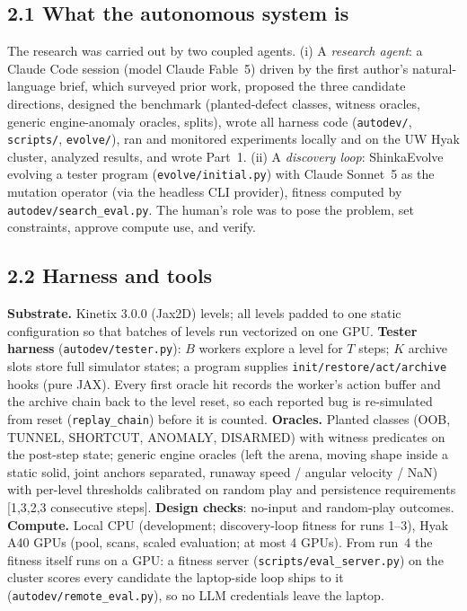 
\subsection*{2.1 What the autonomous system is}
The research was carried out by two coupled agents. (i) A \emph{research agent}: a Claude Code session (model Claude Fable~5)
driven by the first author's natural-language brief, which surveyed prior work, proposed the three candidate directions,
designed the benchmark (planted-defect classes, witness oracles, generic engine-anomaly oracles, splits), wrote all harness
code (\texttt{autodev/}, \texttt{scripts/}, \texttt{evolve/}), ran and monitored experiments locally and on the UW Hyak cluster,
analyzed results, and wrote Part~1. (ii) A \emph{discovery loop}: ShinkaEvolve~\cite{shinka} evolving a tester program
(\texttt{evolve/initial.py}) with Claude Sonnet~5 as the mutation operator (via the headless CLI provider), fitness computed by
\texttt{autodev/search\_eval.py}. The human's role was to pose the problem, set constraints, approve compute use, and verify.

\subsection*{2.2 Harness and tools}
\textbf{Substrate.} Kinetix 3.0.0 (Jax2D) levels; all levels padded to one static configuration so that batches of levels
run vectorized on one GPU. \textbf{Tester harness} (\texttt{autodev/tester.py}): $B$ workers explore a level for $T$ steps;
$K$ archive slots store full simulator states; a program supplies \texttt{init/restore/act/archive} hooks (pure JAX).
Every first oracle hit records the worker's action buffer and the archive chain back to the level reset, so each reported bug is
re-simulated from reset (\texttt{replay\_chain}) before it is counted. \textbf{Oracles.} Planted classes (OOB, TUNNEL, SHORTCUT,
ANOMALY, DISARMED) with witness predicates on the post-step state; generic engine oracles (left the arena, moving shape inside a
static solid, joint anchors separated, runaway speed / angular velocity / NaN) with per-level thresholds calibrated on random play
and persistence requirements [1,3,2,3 consecutive steps]. \textbf{Design checks}: no-input and random-play outcomes.
\textbf{Compute.} Local CPU (development; discovery-loop fitness for runs 1--3), Hyak A40 GPUs (pool, scans, scaled evaluation; at most 4 GPUs).
From run~4 the fitness itself runs on a GPU: a fitness server (\texttt{scripts/eval\_server.py}) on the cluster scores every candidate the laptop-side
loop ships to it (\texttt{autodev/remote\_eval.py}), so no LLM credentials leave the laptop.


